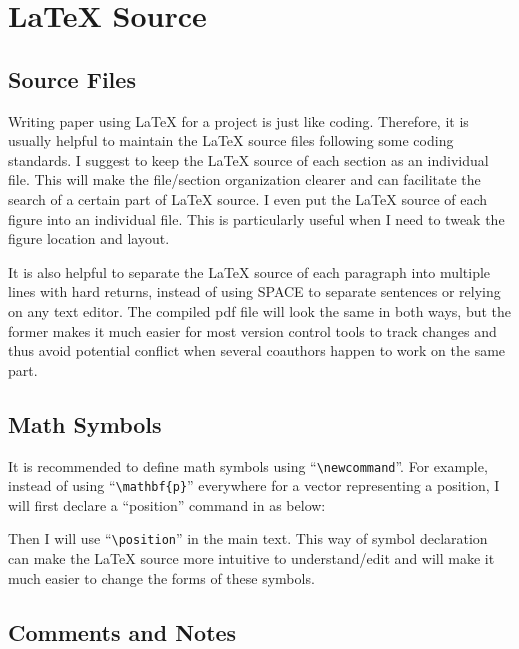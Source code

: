 \section{LaTeX Source}
\label{sec:source}

\subsection{Source Files}

Writing paper using LaTeX for a project is just like coding. Therefore, it is usually helpful to maintain the LaTeX source files following some coding standards.
I suggest to keep the LaTeX source of each section as an individual file. This will make the file/section organization clearer and can facilitate the search of a certain part of LaTeX source.
I even put the LaTeX source of each figure into an individual file. This is particularly useful when I need to tweak the figure location and layout.

It is also helpful to separate the LaTeX source of each paragraph into multiple lines with hard returns, instead of using SPACE to separate sentences or relying on any text editor.
The compiled pdf file will look the same in both ways, but the former makes it much easier for most version control tools to track changes and thus avoid potential conflict when several coauthors happen to work on the same part.

\subsection{Math Symbols}

It is recommended to define math symbols using ``\verb|\newcommand|''.
For example, instead of using ``\verb|\mathbf{p}|'' everywhere for a vector representing a position, I will first declare a ``position'' command in  as below:
\begin{latexexample}
\newcommand{\position}{\mathbf{p}}
\end{latexexample}
Then I will use ``\verb|\position|'' in the main text.
This way of symbol declaration can make the LaTeX source more intuitive to understand/edit and will make it much easier to change the forms of these symbols.

\subsection{Comments and Notes}

